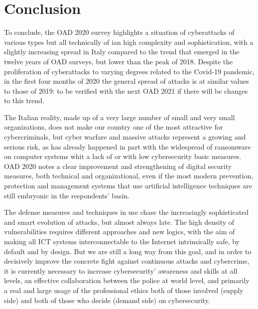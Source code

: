 \documentclass{easychair}
\begin{document}
\section{Conclusion}

To conclude, the OAD 2020 survey highlights a situation of cyberattacks of various types but all technically of ian high complexity and sophistication, with a slightly increasing 
spread  in Italy  compared to the trend that emerged in the twelve years of OAD surveys, but lower than the peak of 2018. Despite the proliferation of cyberattacks to varying 
degrees related to the Covid-19 pandemic, in the first four months of 2020 the general spread of attacks is at similar values to those of 2019: to be verified with the next OAD 2021
if there will be changes to this trend.

The Italian reality, made up of a very large number of small and very small organizations, does not make our country one of the most attractive for cybercriminals, but cyber warfare
and massive attacks represent a growing and serious risk, as has already happened in part with the widespread of ransomware on computer systems whit a lack of or  with low 
cybersecurity  basic measures. OAD 2020 notes a clear improvement and strengthening of digital security measures, both technical and organizational, even if the most modern 
prevention, protection and management systems that use artificial intelligence techniques are still embryonic  in the respondents' basin.

The defense measures and techniques in use chase the increasingly sophisticated and smart evolution of attacks, but almost always late. The high density of vulnerabilities 
requires different approaches and new logics, with the aim of making all ICT systems interconnectable to the Internet intrinsically safe, by default and by design. But we are 
still a long way from this goal, and in order to decisively improve the concrete fight against continuous attacks and cybercrime, it is currently necessary to increase 
cybersecurity’ awareness and skills at all levels, an effective collaboration between the police at world level, and primarily a real and large usage of the professional ethics
 both of those involved (supply side) and both of those who decide (demand side) on cybersecurity.

 
\end{document}
